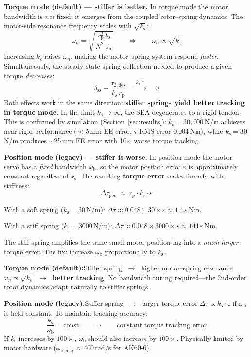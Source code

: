 \documentclass[11pt,a4paper]{article}
\newcommand{\rp}{r_{\mathrm{p}}}
\newcommand{\ks}{k_{\mathrm{s}}}
\newcommand{\wb}{\omega_{\mathrm{b}}}
\newcommand{\Jm}{J_{\mathrm{m}}}
\begin{document}
\medskip
\textbf{Torque mode (default) --- stiffer is better.}\quad
In torque mode the motor bandwidth is \emph{not} fixed; it emerges from the coupled rotor--spring dynamics.  The motor-side resonance frequency scales with $\sqrt{\ks}$:
\begin{equation}
    \omega_n = \sqrt{\frac{\rp^2 \, \ks}{N^2 \, \Jm}}
    \qquad \Longrightarrow \qquad
    \omega_n \propto \sqrt{\ks}
\end{equation}
Increasing $\ks$ raises $\omega_n$, making the motor--spring system respond \emph{faster}.  Simultaneously, the steady-state spring deflection needed to produce a given torque \emph{decreases}:
\begin{equation}
    \delta_{\mathrm{ss}} = \frac{\tau_{2,\mathrm{des}}}{\ks \, \rp}
    \quad \xrightarrow{\;\ks \uparrow\;}
    \quad 0
\end{equation}
Both effects work in the same direction: \textbf{stiffer springs yield better tracking in torque mode}.  In the limit $\ks \to \infty$, the SEA degenerates to a rigid tendon.  This is confirmed by simulation (Section~\ref{sec:results}): $\ks = 30{,}000$\,N/m achieves near-rigid performance ($<5$\,mm EE error, $\tau$ RMS error $0.004$\,Nm), while $\ks = 30$\,N/m produces $\sim$25\,mm EE error with 10$\times$ worse torque tracking.

\medskip
\textbf{Position mode (legacy) --- stiffer is worse.}\quad
In position mode the motor servo has a \emph{fixed} bandwidth $\wb$, so the motor position error $\varepsilon$ is approximately constant regardless of $\ks$.  The resulting \textbf{torque error} scales linearly with stiffness:
\begin{equation}
\boxed{\Delta\tau_{\mathrm{pos}} \;\approx\; \rp \cdot \ks \cdot \varepsilon}
\end{equation}

With a soft spring ($\ks = 30$\,N/m): $\Delta\tau \approx 0.048 \times 30 \times \varepsilon \approx 1.4\,\varepsilon$\,Nm.

With a stiff spring ($\ks = 3000$\,N/m): $\Delta\tau \approx 0.048 \times 3000 \times \varepsilon \approx 144\,\varepsilon$\,Nm.

The stiff spring amplifies the same small motor position lag into a \emph{much larger} torque error.  The fix: increase $\wb$ proportionally to $\ks$.

\begin{resultbox}
\textbf{Torque mode (default):}\quad Stiffer spring $\;\to\;$ higher motor--spring resonance $\omega_n \propto \sqrt{\ks}$ $\;\to\;$ \textbf{better tracking}.  No bandwidth tuning required---the 2nd-order rotor dynamics adapt naturally to stiffer springs.

\medskip
\textbf{Position mode (legacy):}\quad Stiffer spring $\;\to\;$ larger torque error $\Delta\tau \propto \ks \cdot \varepsilon$ if $\wb$ is held constant.  To maintain tracking accuracy:
\[
    \frac{\ks}{\wb} = \text{const} \qquad \Longrightarrow \qquad \text{constant torque tracking error}
\]
If $\ks$ increases by $100\times$, $\wb$ should also increase by $100\times$.  Physically limited by motor hardware ($\omega_{\mathrm{b,max}} \approx 400$\,rad/s for AK60-6).
\end{resultbox}
\end{document}
